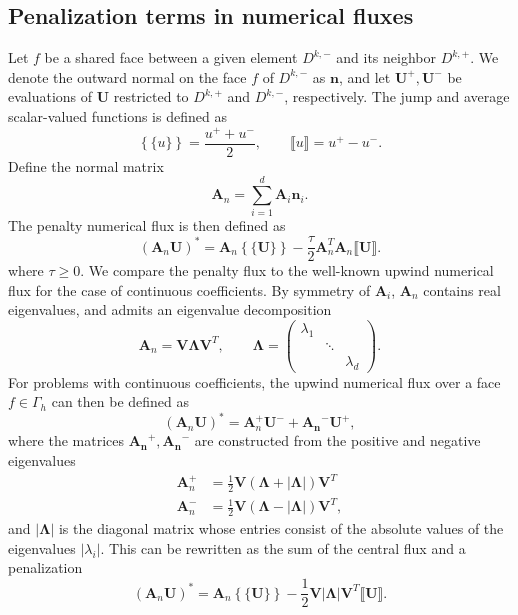 \documentclass[preprint,10pt]{elsarticle}
\newcommand{\LRp}[1]{\left( #1 \right)}
\newcommand{\LRb}[1]{\left| #1 \right|}
\newcommand{\LRc}[1]{\left\{ #1 \right\}}
\newcommand{\jump}[1] {\ensuremath{\llbracket#1\rrbracket}}
\newcommand{\avg}[1] {\ensuremath{\LRc{\!\{#1\}\!}}}
\newcommand{\Gh}{\Gamma_h}
\begin{document}

\subsection{Penalization terms in numerical fluxes}

Let $f$ be a shared face between a given element $D^{k,-}$ and its neighbor $D^{k,+}$.  We denote the outward normal on the face $f$ of $D^{k,-}$ as $\bm{n}$, and let $\bm{U}^+, \bm{U}^-$ be evaluations of $\bm{U}$ restricted to $D^{k,+}$ and $D^{k,-}$, respectively.  The jump and average scalar-valued functions is defined as
\[
\avg{u} = \frac{{u}^+ + u^-}{2}, \qquad \jump{u} = u^+ - u^-.
\]
Define the normal matrix 
\[
{\bm{A}}_n = \sum_{i=1}^d {\bm{A}_i\bm{n}_i}.
\]
The penalty numerical flux is then defined as
\[
(\bm{A}_n\bm{U})^* = \bm{A}_n\avg{\bm{U}} - \frac{\tau}{2} \bm{A}_n^T \bm{A}_n\jump{\bm{U}}.
\]
where $\tau \geq 0$.  We compare the penalty flux to the well-known upwind numerical flux for the case of continuous coefficients.  By symmetry of $\bm{A}_i$, ${\bm{A}}_n$ contains real eigenvalues, and admits an eigenvalue decomposition
\[
\bm{A}_n = \bm{V}{\bm{\Lambda}}\bm{V}^T, \qquad \bm{\Lambda} = 
\left(\begin{array}{ccc}
\lambda_1 & & \\
& \ddots & \\
& & \lambda_d
\end{array}\right).
\]
For problems with continuous coefficients, the upwind numerical flux over a face $f \in \Gh$ can then be defined  as
\[
(\bm{A}_n\bm{U})^* = \bm{A}_n^+\bm{U}^- + \bm{A_n}^- \bm{U}^+,
\]
where the matrices $\bm{A_n}^+,\bm{A_n}^-$ are constructed from the positive and negative eigenvalues 
\begin{align*}
\bm{A}_n^+ &= \frac{1}{2}\bm{V} \LRp{\bm{\Lambda} + \LRb{\bm{\Lambda}}} \bm{V}^T\\
\bm{A}_n^- &= \frac{1}{2}\bm{V} \LRp{\bm{\Lambda} - \LRb{\bm{\Lambda}}} \bm{V}^T,
\end{align*}
and $\LRb{\bm{\Lambda}}$ is the diagonal matrix whose entries consist of the absolute values of the eigenvalues $\LRb{\lambda_i}$.  This can be rewritten as the sum of the central flux and a penalization
\[
(\bm{A}_n\bm{U})^* = \bm{A}_n\avg{\bm{U}} - \frac{1}{2}\bm{V}\LRb{\bm{\Lambda}}\bm{V}^T \jump{\bm{U}}.  
\]
\end{document}
